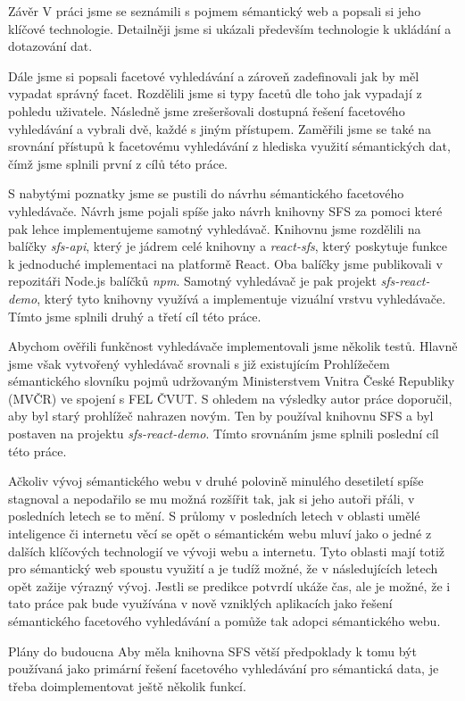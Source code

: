 \chap Závěr
V práci jsme se seznámili s pojmem sémantický web a popsali si jeho klíčové technologie.
Detailněji jsme si ukázali především technologie k ukládání a dotazování dat.

Dále jsme si popsali facetové vyhledávání a zároveň zadefinovali jak by měl vypadat správný facet.
Rozdělili jsme si typy facetů dle toho jak vypadají z pohledu uživatele.
Následně jsme zrešeršovali dostupná řešení facetového vyhledávání a vybrali dvě, každé s jiným přístupem.
Zaměřili jsme se také na srovnání přístupů k facetovému vyhledávání z hlediska využití sémantických dat, čímž jsme splnili první z cílů této práce.

S nabytými poznatky jsme se pustili do návrhu sémantického facetového vyhledávače.
Návrh jsme pojali spíše jako návrh knihovny SFS za pomoci které pak lehce implementujeme samotný vyhledávač.
Knihovnu jsme rozdělili na balíčky {\em sfs-api}, který je jádrem celé knihovny a {\em react-sfs}, který poskytuje funkce k jednoduché implementaci na platformě React.
Oba balíčky jsme publikovali v repozitáři Node.js balíčků {\em npm}.
Samotný vyhledávač je pak projekt {\em sfs-react-demo}, který tyto knihovny využívá a implementuje vizuální vrstvu vyhledávače.
Tímto jsme splnili druhý a třetí cíl této práce.

Abychom ověřili funkčnost vyhledávače implementovali jsme několik testů.
Hlavně jsme však vytvořený vyhledávač srovnali s již existujícím Prohlížečem sémantického slovníku pojmů 
udržovaným Ministerstvem Vnitra České Republiky (MVČR) ve spojení s FEL ČVUT.
S ohledem na výsledky autor práce doporučil, aby byl starý prohlížeč nahrazen novým.
Ten by používal knihovnu SFS a byl postaven na projektu {\em sfs-react-demo}.
Tímto srovnáním jsme splnili poslední cíl této práce.

Ačkoliv vývoj sémantického webu v druhé polovině minulého desetiletí spíše stagnoval a nepodařilo se mu možná rozšířit tak, jak si jeho autoři přáli, v posledních letech se to mění.
S průlomy v posledních letech v oblasti umělé inteligence či internetu věcí se opět o sémantickém webu mluví jako o jedné z dalších klíčových technologií ve vývoji webu a internetu.
Tyto oblasti mají totiž pro sémantický web spoustu využití a je tudíž možné, že v následujících letech opět zažije výrazný vývoj.
Jestli se predikce potvrdí ukáže čas, ale je možné, že i tato práce pak bude využívána v nově vzniklých aplikacích jako řešení sémantického facetového vyhledávání a pomůže tak adopci sémantického webu.

\sec Plány do budoucna
Aby měla knihovna SFS větší předpoklady k tomu být používaná jako primární řešení facetového vyhledávání pro sémantická data, je třeba doimplementovat ještě několik funkcí.

